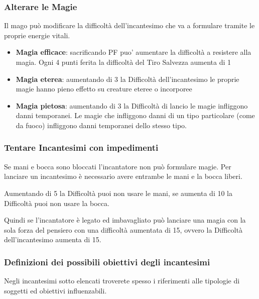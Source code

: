 \subsubsection{Alterare le Magie}

Il mago può modificare la difficoltà dell'incantesimo che va a formulare tramite le proprie energie vitali.

\begin{itemize}
	\item
	\textbf{Magia efficace}: sacrificando PF puo’ aumentare la difficoltà a resistere alla magia. Ogni 4 punti ferita la difficoltà del Tiro Salvezza aumenta di 1
	\item
	\textbf{Magia eterea}: aumentando di 3 la Difficoltà dell'incantesimo le proprie magie hanno pieno effetto su creature eteree o incorporee
	\item
	\textbf{Magia pietosa}: aumentando di 3 la Difficoltà di lancio le magie infliggono danni temporanei. 
	Le magie che infliggono danni di un tipo particolare (come da fuoco) infliggono danni temporanei dello stesso tipo.
\end{itemize}

\subsubsection{Tentare Incantesimi con impedimenti} 

Se mani e bocca sono bloccati l'incantatore non può formulare magie. Per lanciare un incantesimo è necessario avere entrambe le mani e la bocca liberi.

Aumentando di 5 la Difficoltà puoi non usare le mani, se aumenta di 10 la Difficoltà puoi non usare la bocca.

Quindi se l'incantatore è legato ed imbavagliato può lanciare una magia con la sola forza del pensiero con una difficoltà aumentata di 15, ovvero la Difficoltà dell'incantesimo aumenta di 15.

\subsubsection{Definizioni dei possibili obiettivi degli incantesimi}

Negli incantesimi sotto elencati troverete spesso i riferimenti alle tipologie di soggetti ed obiettivi influenzabili.\\

